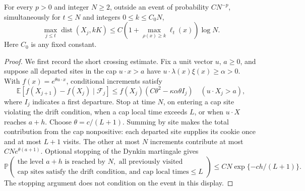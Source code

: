 \begin{lemma}\label{lem:core-crossing}
For every $p>0$ and integer $N\geq2$, outside an event of probability
$CN^{-p}$, simultaneously for $t\leq N$ and integers $0\leq k\leq C_0N$,
\begin{equation}\label{eq:core-crossing}
 \max_{j\leq t}\operatorname{dist}(X_j,kK)
 \leq C\left(1+\max_{\rho(x)\geq k}\ell_t(x)\right)\log N.
\end{equation}
Here $C_0$ is any fixed constant.
\end{lemma}
\begin{proof}
We first record the short crossing estimate. Fix a unit vector $u$, $a\geq0$,
and suppose all departed sites in the cap $u\cdot x>a$ have
$u\cdot\lambda(x)\xi(x)\geq\alpha>0$. With
$f(x)=e^{\theta u\cdot x}$, conditional increments satisfy
\[
 \mathbb E[f(X_{j+1})-f(X_j)\mid\mathcal F_j]
 \leq f(X_j)(C\theta^2-\kappa\alpha\theta I_j)
 \quad (u\cdot X_j>a),
\]
where $I_j$ indicates a first departure. Stop at time $N$, on entering
a cap site violating the drift condition, when a cap local time exceeds
$L$, or when $u\cdot X$ reaches $a+h$. Choose $\theta=c/(L+1)$.
Summing by site makes the total contribution from the cap nonpositive:
each departed site supplies its cookie once and at most $L+1$ visits.
The other at most $N$ increments contribute at most
$CN e^{\theta(a+1)}$. Optional stopping of the Dynkin martingale gives
\begin{equation}\label{eq:core-exp-crossing}
 \mathbb P\left(\begin{array}{c}
  \text{the level }a+h\text{ is reached by }N,\text{ all previously visited}\\
  \text{cap sites satisfy the drift condition, and cap local times}\leq L
 \end{array}\right)
 \leq CN\exp\{-ch/(L+1)\}.
\end{equation}
The stopping argument does not condition on the event in this display.


\end{proof}

